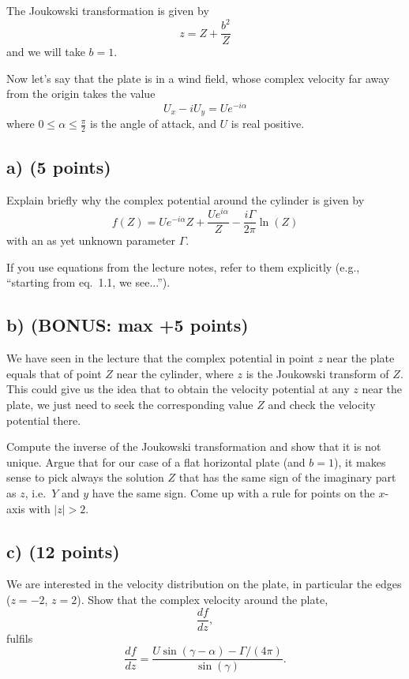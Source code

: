 \documentclass[11pt,a4paper]{article}
\begin{document}
The Joukowski transformation is given by
\[
z = Z + \frac{b^2}{Z}
\]
and we will take $b=1$.

Now let’s say that the plate is in a wind field, whose complex velocity far away from the origin takes the value
\[
U_x - i U_y = U e^{-i\alpha}
\]
where $0 \le \alpha \le \frac{\pi}{2}$ is the angle of attack, and $U$ is real positive.

\subsection*{a) (5 points)}

Explain briefly why the complex potential around the cylinder is given by
\[
f(Z) = U e^{-i\alpha} Z + \frac{U e^{i\alpha}}{Z}
- \frac{i\Gamma}{2\pi} \ln(Z)
\tag{1}
\]
with an as yet unknown parameter $\Gamma$.

If you use equations from the lecture notes, refer to them explicitly (e.g., ``starting from eq.~1.1, we see...'').

\subsection*{b) (BONUS: max +5 points)}

We have seen in the lecture that the complex potential in point $z$ near the plate equals that of point $Z$ near the cylinder,
where $z$ is the Joukowski transform of $Z$.
This could give us the idea that to obtain the velocity potential at any $z$ near the plate, we just need to seek the
corresponding value $Z$ and check the velocity potential there.

Compute the inverse of the Joukowski transformation and show that it is not unique.
Argue that for our case of a flat horizontal plate (and $b=1$), it makes sense to pick always the solution $Z$ that has
the same sign of the imaginary part as $z$, i.e.\ $Y$ and $y$ have the same sign.
Come up with a rule for points on the $x$-axis with $|z|>2$.

\subsection*{c) (12 points)}

We are interested in the velocity distribution on the plate, in particular the edges ($z=-2$, $z=2$).
Show that the complex velocity around the plate,
\[
\frac{df}{dz},
\]
fulfils
\[
\frac{df}{dz}
=
\frac{U \sin(\gamma - \alpha) - \Gamma/(4\pi)}
{\sin(\gamma)}.
\]
\end{document}
